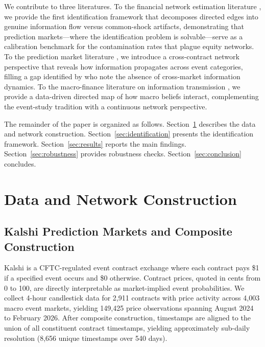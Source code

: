 \documentclass[12pt,letterpaper]{article}
\begin{document}
We contribute to three literatures. To the financial network estimation literature \citep{billio2012econometric,diebold2014network,barigozzi2019nets}, we provide the first identification framework that decomposes directed edges into genuine information flow versus common-shock artifacts, demonstrating that prediction markets---where the identification problem is solvable---serve as a calibration benchmark for the contamination rates that plague equity networks. To the prediction market literature \citep{wolfers2004prediction,snowberg2013prediction,bergemann2021information}, we introduce a cross-contract network perspective that reveals how information propagates across event categories, filling a gap identified by \citet{bergemann2021information} who note the absence of cross-market information dynamics. To the macro-finance literature on information transmission \citep{gurkaynak2005actions,bauer2023alternative}, we provide a data-driven directed map of how macro beliefs interact, complementing the event-study tradition with a continuous network perspective.

The remainder of the paper is organized as follows. Section~\ref{sec:data} describes the data and network construction. Section~\ref{sec:identification} presents the identification framework. Section~\ref{sec:results} reports the main findings. Section~\ref{sec:robustness} provides robustness checks. Section~\ref{sec:conclusion} concludes.


\section{Data and Network Construction}\label{sec:data}

\subsection{Kalshi Prediction Markets and Composite Construction}

Kalshi is a CFTC-regulated event contract exchange where each contract pays \$1 if a specified event occurs and \$0 otherwise. Contract prices, quoted in cents from 0 to 100, are directly interpretable as market-implied event probabilities. We collect 4-hour candlestick data for 2,911 contracts with price activity across 4,003 macro event markets, yielding 149,425 price observations spanning August 2024 to February 2026. After composite construction, timestamps are aligned to the union of all constituent contract timestamps, yielding approximately sub-daily resolution (8,656 unique timestamps over 540 days).
\end{document}
